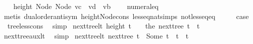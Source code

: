 \begin{isabellebody}
\ \ \isamarkupfalse%
\ {\isachardoublequoteopen}height\ {\isacharparenleft}{\kern0pt}Node\ {\isacharparenleft}{\kern0pt}Node\ {\isacharparenleft}{\kern0pt}vc\ {\isacharhash}{\kern0pt}\ vd{\isacharparenright}{\kern0pt}\ {\isacharhash}{\kern0pt}\ vb{\isacharparenright}{\kern0pt}{\isacharparenright}{\kern0pt}\ {\isasymge}\ {}{\isachardoublequoteclose}\ \isamarkupfalse%
\ numeral{\isacharunderscore}{\kern0pt}{}{\isacharunderscore}{\kern0pt}eq{\isacharunderscore}{\kern0pt}{}\isanewline
\ \ \ \ \isamarkupfalse%
\ {\isacharparenleft}{\kern0pt}metis\ dual{\isacharunderscore}{\kern0pt}order{\isachardot}{\kern0pt}antisym\ height{\isacharunderscore}{\kern0pt}Node{\isacharunderscore}{\kern0pt}cons\ less{\isacharunderscore}{\kern0pt}eq{\isacharunderscore}{\kern0pt}nat{\isachardot}{\kern0pt}simps{\isacharparenleft}{\kern0pt}{}{\isacharparenright}{\kern0pt}\ not{\isacharunderscore}{\kern0pt}less{\isacharunderscore}{\kern0pt}eq{\isacharunderscore}{\kern0pt}eq{\isacharparenright}{\kern0pt}\isanewline
\ \ \isamarkupfalse%
\ \isamarkupfalse%
\ {\isacharquery}{\kern0pt}case\ \isamarkupfalse%
\ {}\ tree{\isacharunderscore}{\kern0pt}less{\isacharunderscore}{\kern0pt}cons{}\ \isamarkupfalse%
\ simp\isanewline
{}\isamarkupfalse%
%
\endisatagproof
{\isafoldproof}%
%
\isadelimproof
\isanewline
%
\endisadelimproof
\isanewline
{}\isamarkupfalse%
\ next{\isacharunderscore}{\kern0pt}tree{\isacharunderscore}{\kern0pt}lt{\isacharcolon}{\kern0pt}\ {\isachardoublequoteopen}height\ t\ {\isasymge}\ {}\ {\isasymLongrightarrow}\ the\ {\isacharparenleft}{\kern0pt}next{\isacharunderscore}{\kern0pt}tree\ t{\isacharparenright}{\kern0pt}\ {\isacharless}{\kern0pt}\ t{\isachardoublequoteclose}\isanewline
%
\isadelimproof
\ \ %
\endisadelimproof
%
\isatagproof
{}\isamarkupfalse%
\ next{\isacharunderscore}{\kern0pt}tree{\isacharunderscore}{\kern0pt}aux{\isacharunderscore}{\kern0pt}lt\ \isamarkupfalse%
\ simp%
\endisatagproof
{\isafoldproof}%
%
\isadelimproof
\isanewline
%
\endisadelimproof
\isanewline
{}\isamarkupfalse%
\ next{\isacharunderscore}{\kern0pt}tree{\isacharunderscore}{\kern0pt}lt{\isacharprime}{\kern0pt}{\isacharcolon}{\kern0pt}\ {\isachardoublequoteopen}next{\isacharunderscore}{\kern0pt}tree\ t\ {\isacharequal}{\kern0pt}\ Some\ t{\isacharprime}{\kern0pt}\ {\isasymLongrightarrow}\ t{\isacharprime}{\kern0pt}\ {\isacharless}{\kern0pt}\ t{\isachardoublequoteclose}\isanewline

\end{isabellebody}
